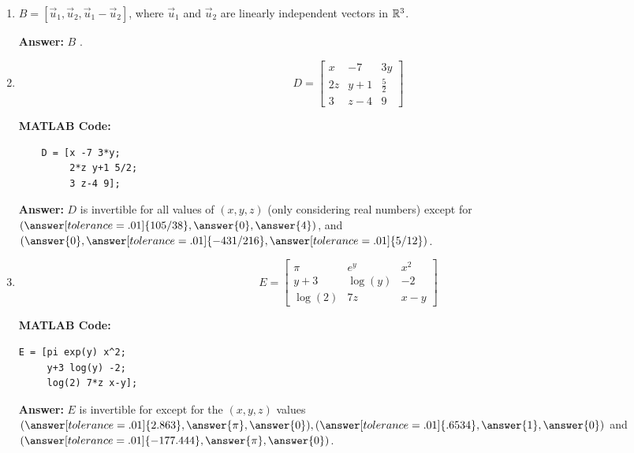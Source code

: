 \documentclass{ximera}
\begin{document}
\begin{example}
\begin{enumerate}
\textbf{MATLAB Code:}
\begin{verbatim}
    [ 10  -9   1   6  -3   3   3  -5  -1  -5;
   4  -7 -10  -8  -5   3  -5   9   2   9;
   9   5   1   4   1   3  -5   7  10   4;
   3   0  -2   7  -2   1   4   7   7   6;
   3  -2   5   0   9  -4  10   6  10  -7;
  -2  -4  -7 -10  -3  -8  -5  -1  -3  -8;
 -10  -7  -1  -3  -8   7   7   7  -5  -9;
   2   9   2  10  -5  -4   8   9  -4   2;
   5  -2  -9  -7  -7   2   7 -10  -3   2;
   3  -8   0   6   7  -1   5   5   1  -3 ]
\end{verbatim}

    \textbf{Answer:}
    $B$ .


    \item $B=[\vec{u}_1,\vec{u}_2,\vec{u}_1-\vec{u}_2]$, where $\vec{u}_1$ and $\vec{u}_2$ are linearly independent vectors in $\mathbb{R}^3$.
    
    \textbf{Answer:}
    $B$ .

        \item \[
        D = \begin{bmatrix} 
        x & -7 & 3y \\ 
        2z & y+1 & \frac{5}{2} \\ 
        3 & z-4 & 9 
        \end{bmatrix}
        \]

\textbf{MATLAB Code:}
\begin{verbatim}
    D = [x -7 3*y;
         2*z y+1 5/2;
         3 z-4 9];
\end{verbatim}

    \textbf{Answer:}
        $D$ is invertible for all values of $(x,y,z)$ (only considering real numbers) except for $(\answer[tolerance=.01]{105/38}, \answer{0}, \answer{4})$, and $(\answer{0}, \answer[tolerance=.01]{-431/216}, \answer[tolerance=.01]{5/12})$.


\item
        \[
        E = \begin{bmatrix} 
        \pi & e^y & x^2 \\ 
        y+3 & \log(y) & -2 \\ 
        \log(2) & 7z & x - y 
        \end{bmatrix}
        \]

\textbf{MATLAB Code:}
\begin{verbatim}
E = [pi exp(y) x^2;
     y+3 log(y) -2;
     log(2) 7*z x-y];
\end{verbatim}
            
    \textbf{Answer:}
        $E$ is invertible for except for the $(x,y,z)$ values $(\answer[tolerance=.01]{2.863}, \answer{\pi},\answer{0}), (\answer[tolerance=.01]{.6534}, \answer{1},\answer{0})$ and $(\answer[tolerance=.01]{-177.444}, \answer{\pi},\answer{0})$.
    \end{enumerate}
\end{example}
\end{document}
